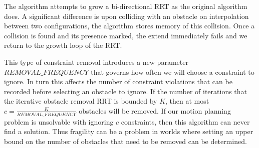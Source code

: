 {}

The algorithm attempts to grow a bi-directional RRT as the original algorithm does. A significant difference is upon colliding with an obstacle on interpolation between two configurations, the algorithm stores memory of this collision. Once a collision is found and its presence marked, the extend immediately fails and we return to the growth loop of the RRT. 

This type of constraint removal introduces a new parameter $REMOVAL\_FREQUENCY$ that governs how often we will choose a constraint to ignore. In turn this affects the number of constraint violations that can be recorded before selecting an obstacle to ignore. If the number of iterations that the iterative obstacle removal RRT is bounded by $K$, then at most $c=\frac{K}{REMOVAL\_FREQUENCY}$ obstacles will be removed. If our motion planning problem is unsolvable with ignoring $c$ constraints, then this algorithm can never find a solution. Thus fragility can be a problem in worlds where setting an upper bound on the number of obstacles that need to be removed can be determined.


